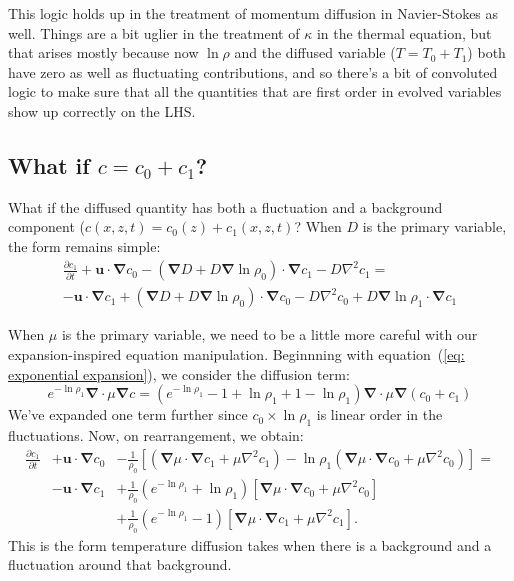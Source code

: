 \documentclass[letterpaper,12pt]{paper}
\newcommand{\del}{\ensuremath{\mathbf{\nabla}}}
\renewcommand{\vec}[1]{\ensuremath{\mathbf{#1}}}
\begin{document}
This logic holds up in the treatment of momentum diffusion in Navier-Stokes as well.  Things are a bit uglier in the treatment of $\kappa$ in the thermal equation, but that arises mostly because now $\ln \rho$ and the diffused variable ($T=T_0+T_1$) both have zero as well as fluctuating contributions, and so there's a bit of convoluted logic to make sure that all the quantities that are first order in evolved variables show up correctly  on the LHS. 

\subsection{What if $c=c_0 + c_1$?}
What if the diffused quantity has both a fluctuation and a background
component ($c(x,z,t) = c_0(z) + c_1(x,z,t)$?   
When $D$ is the primary variable, the form remains simple:
\begin{multline}
\frac{\partial c_1}{\partial t} +\vec{u}\cdot\del c_0- (\del D + D\del \ln \rho_0) \cdot \del c_1 - D \nabla^2 c_1 =\\
 -\vec{u}\cdot\del c_1 + (\del D + D\del \ln \rho_0) \cdot \del c_0 - D \nabla^2 c_0+ D\del \ln \rho_1 \cdot \del c_1 
\end{multline}



When $\mu$ is the primary variable, we need to be a little more careful with our
expansion-inspired equation manipulation.  Beginnning with equation~(\ref{eq: exponential expansion}),
we consider the diffusion term:
\begin{equation}
e^{-\ln \rho_1} \del \cdot \mu \del c = 
\left(e^{-\ln \rho_1} - 1 +\ln \rho_1 +1 -\ln \rho_1\right)  \del
\cdot \mu \del \left(c_0 + c_1\right)
\end{equation}
We've expanded one term further since $c_0 \times \ln \rho_1$ is
linear order in the fluctuations.  Now, on rearrangement, we obtain:
\begin{eqnarray}
\frac{\partial c_1}{\partial t} &+\vec{u}\cdot\del c_0&-\frac{1}{\rho_0}\left[\left(\del \mu \cdot \del c_1 + \mu \nabla^2 c_1\right)
-\ln \rho_1 \left(\del \mu \cdot \del c_0 + \mu \nabla^2 c_0\right)\right] 
=\nonumber 
\\ &-\vec{u}\cdot\del c_1  &+ \frac{1}{\rho_0}\left(e^{-\ln \rho_1} + \ln \rho_1\right)\left[\del \mu \cdot \del c_0 + \mu \nabla^2 c_0 \right]
\\ && +\frac{1}{\rho_0}\left(e^{-\ln \rho_1} -1\right)\left[\del \mu \cdot \del c_1 + \mu \nabla^2 c_1\right].\nonumber
\end{eqnarray}
This is the form temperature diffusion takes when there is a background and a fluctuation around that background.
\end{document}
